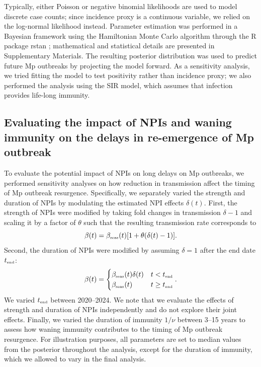 \documentclass[12pt]{article}
\newcommand{\tsub}[2]{#1_{{\textrm{\tiny #2}}}}
\begin{document}
Typically, either Poisson or negative binomial likelihoods are used to model discrete case counts;
since incidence proxy is a continuous variable, we relied on the log-normal likelihood instead.
Parameter estimation was performed in a Bayesian framework using the Hamiltonian Monte Carlo algorithm through the R package rstan \citep{carpenter2017stan,rstan};
mathematical and statistical details are presented in Supplementary Materials.
The resulting posterior distribution was used to predict future Mp outbreaks by projecting the model forward.
As a sensitivity analysis, we tried fitting the model to test positivity rather than incidence proxy;
we also performed the analysis using the SIR model, which assumes that infection provides life-long immunity.

\subsection{Evaluating the impact of NPIs and waning immunity on the delays in re-emergence of Mp outbreak}

To evaluate the potential impact of NPIs on long delays on Mp outbreaks, we performed sensitivity analyses on how reduction in transmission affect the timing of Mp outbreak resurgence.
Specifically, we separately varied the strength and duration of NPIs by modulating the estimated NPI effects $\delta(t)$.
First, the strength of NPIs were modified by taking fold changes in transmission $\delta-1$ and scaling it by a factor of $\theta$ such that the resulting transmission rate corresponds to
\begin{equation}
\beta(t) = \tsub{\beta}{seas}(t) [1+\theta (\delta(t)-1)].
\end{equation}
Second, the duration of NPIs were modified by assuming $\delta = 1$ after the end date $\tsub{t}{end}$:
\begin{equation}
\beta(t) = \begin{cases}
\tsub{\beta}{seas}(t) \delta(t) & t <  \tsub{t}{end}\\
\tsub{\beta}{seas}(t) & t \geq \tsub{t}{end}
\end{cases}.
\end{equation}
We varied $\tsub{t}{end}$ between 2020--2024.
We note that we evaluate the effects of strength and duration of NPIs independently and do not explore their joint effects.
Finally, we varied the duration of immunity $1/\nu$ between 3--15 years to assess how waning immunity contributes to the timing of Mp outbreak resurgence.
For illustration purposes, all parameters are set to median values from the posterior throughout the analysis, except for the duration of immunity, which we allowed to vary in the final analysis.
\end{document}
